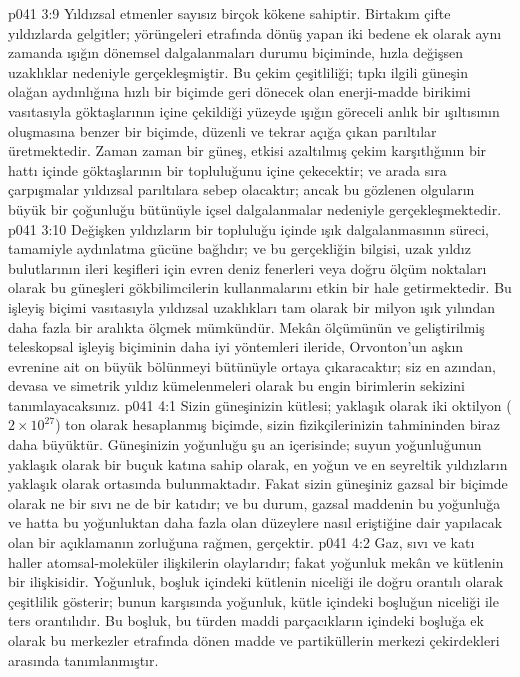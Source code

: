 \vs p041 3:9 Yıldızsal etmenler sayısız birçok kökene sahiptir. Birtakım çifte yıldızlarda gelgitler; yörüngeleri etrafında dönüş yapan iki bedene ek olarak aynı zamanda ışığın dönemsel dalgalanmaları durumu biçiminde, hızla değişsen uzaklıklar nedeniyle gerçekleşmiştir. Bu çekim çeşitliliği; tıpkı ilgili güneşin olağan aydınlığına hızlı bir biçimde geri dönecek olan enerji\hyp{}madde birikimi vasıtasıyla göktaşlarının içine çekildiği yüzeyde ışığın göreceli anlık bir ışıltısının oluşmasına benzer bir biçimde, düzenli ve tekrar açığa çıkan parıltılar üretmektedir. Zaman zaman bir güneş, etkisi azaltılmış çekim karşıtlığının bir hattı içinde göktaşlarının bir topluluğunu içine çekecektir; ve arada sıra çarpışmalar yıldızsal parıltılara sebep olacaktır; ancak bu gözlenen olguların büyük bir çoğunluğu bütünüyle içsel dalgalanmalar nedeniyle gerçekleşmektedir.
\vs p041 3:10 Değişken yıldızların bir topluluğu içinde ışık dalgalanmasının süreci, tamamiyle aydınlatma gücüne bağlıdır; ve bu gerçekliğin bilgisi, uzak yıldız bulutlarının ileri keşifleri için evren deniz fenerleri veya doğru ölçüm noktaları olarak bu güneşleri gökbilimcilerin kullanmalarını etkin bir hale getirmektedir. Bu işleyiş biçimi vasıtasıyla yıldızsal uzaklıkları tam olarak bir milyon ışık yılından daha fazla bir aralıkta ölçmek mümkündür. Mekân ölçümünün ve geliştirilmiş teleskopsal işleyiş biçiminin daha iyi yöntemleri ileride, Orvonton’un aşkın evrenine ait on büyük bölünmeyi bütünüyle ortaya çıkaracaktır; siz en azından, devasa ve simetrik yıldız kümelenmeleri olarak bu engin birimlerin sekizini tanımlayacaksınız.
\vs p041 4:1 Sizin güneşinizin kütlesi; yaklaşık olarak iki oktilyon ($2\times 10^{27}$) ton olarak hesaplanmış biçimde, sizin fizikçilerinizin tahmininden biraz daha büyüktür. Güneşinizin yoğunluğu şu an içerisinde; suyun yoğunluğunun yaklaşık olarak bir buçuk katına sahip olarak, en yoğun ve en seyreltik yıldızların yaklaşık olarak ortasında bulunmaktadır. Fakat sizin güneşiniz gazsal bir biçimde olarak ne bir sıvı ne de bir katıdır; ve bu durum, gazsal maddenin bu yoğunluğa ve hatta bu yoğunluktan daha fazla olan düzeylere nasıl eriştiğine dair yapılacak olan bir açıklamanın zorluğuna rağmen, gerçektir.
\vs p041 4:2 Gaz, sıvı ve katı haller atomsal\hyp{}moleküler ilişkilerin olaylarıdır; fakat yoğunluk mekân ve kütlenin bir ilişkisidir. Yoğunluk, boşluk içindeki kütlenin niceliği ile doğru orantılı olarak çeşitlilik gösterir; bunun karşısında yoğunluk, kütle içindeki boşluğun niceliği ile ters orantılıdır. Bu boşluk, bu türden maddi parçacıkların içindeki boşluğa ek olarak bu merkezler etrafında dönen madde ve partiküllerin merkezi çekirdekleri arasında tanımlanmıştır.

